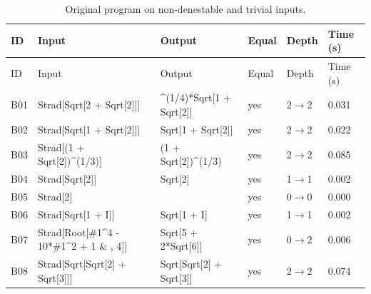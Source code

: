 \begin{longtable}{@{}p{}>{\ttfamily\footnotesize\raggedright\arraybackslash}p{}>{\ttfamily\footnotesize\raggedright\arraybackslash}p{}p{}p{}p{}@{}}
\caption{Original program on non-denestable and trivial inputs.}\label{tab:origB}\\
\toprule ID & Input & Output & Equal & Depth & Time (s)\\\midrule\endfirsthead
\toprule ID & Input & Output & Equal & Depth & Time (s)\\\midrule\endhead
\bottomrule\endfoot
B01 & Strad[\allowbreak{}Sqrt[\allowbreak{}2 +\allowbreak{} Sqrt[\allowbreak{}2]\allowbreak{}]\allowbreak{}]\allowbreak{} & 2\textasciicircum{}\allowbreak{}(\allowbreak{}1/\allowbreak{}4)\allowbreak{}*\allowbreak{}Sqrt[\allowbreak{}1 +\allowbreak{} Sqrt[\allowbreak{}2]\allowbreak{}]\allowbreak{} & yes & 2$\to$2 & 0.031\\
B02 & Strad[\allowbreak{}Sqrt[\allowbreak{}1 +\allowbreak{} Sqrt[\allowbreak{}2]\allowbreak{}]\allowbreak{}]\allowbreak{} & Sqrt[\allowbreak{}1 +\allowbreak{} Sqrt[\allowbreak{}2]\allowbreak{}]\allowbreak{} & yes & 2$\to$2 & 0.022\\
B03 & Strad[\allowbreak{}(\allowbreak{}1 +\allowbreak{} Sqrt[\allowbreak{}2]\allowbreak{})\allowbreak{}\textasciicircum{}\allowbreak{}(\allowbreak{}1/\allowbreak{}3)\allowbreak{}]\allowbreak{} & (\allowbreak{}1 +\allowbreak{} Sqrt[\allowbreak{}2]\allowbreak{})\allowbreak{}\textasciicircum{}\allowbreak{}(\allowbreak{}1/\allowbreak{}3)\allowbreak{} & yes & 2$\to$2 & 0.085\\
B04 & Strad[\allowbreak{}Sqrt[\allowbreak{}2]\allowbreak{}]\allowbreak{} & Sqrt[\allowbreak{}2]\allowbreak{} & yes & 1$\to$1 & 0.002\\
B05 & Strad[\allowbreak{}2]\allowbreak{} & 2 & yes & 0$\to$0 & 0.000\\
B06 & Strad[\allowbreak{}Sqrt[\allowbreak{}1 +\allowbreak{} I]\allowbreak{}]\allowbreak{} & Sqrt[\allowbreak{}1 +\allowbreak{} I]\allowbreak{} & yes & 1$\to$1 & 0.002\\
B07 & Strad[\allowbreak{}Root[\allowbreak{}\#1\textasciicircum{}\allowbreak{}4 -\allowbreak{} 10*\allowbreak{}\#1\textasciicircum{}\allowbreak{}2 +\allowbreak{} 1 \& ,\allowbreak{} 4]\allowbreak{}]\allowbreak{} & Sqrt[\allowbreak{}5 +\allowbreak{} 2*\allowbreak{}Sqrt[\allowbreak{}6]\allowbreak{}]\allowbreak{} & yes & 0$\to$2 & 0.006\\
B08 & Strad[\allowbreak{}Sqrt[\allowbreak{}Sqrt[\allowbreak{}2]\allowbreak{} +\allowbreak{} Sqrt[\allowbreak{}3]\allowbreak{}]\allowbreak{}]\allowbreak{} & Sqrt[\allowbreak{}Sqrt[\allowbreak{}2]\allowbreak{} +\allowbreak{} Sqrt[\allowbreak{}3]\allowbreak{}]\allowbreak{} & yes & 2$\to$2 & 0.074\\

\end{longtable}
